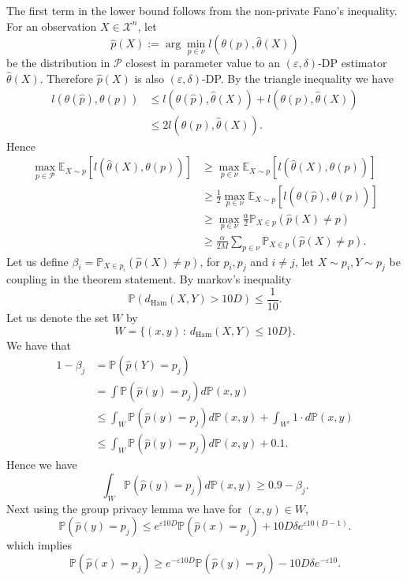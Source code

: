 \documentclass[letterpaper,12pt]{article}
\numberwithin{equation}{section}
\theoremstyle{plain}
\numberwithin{Theorem}{section}
\numberwithin{corollary}{section}
\numberwithin{proposition}{section}
\numberwithin{Lemma}{section}
{
	\theoremstyle{definition}
	\newtheorem{Definition}{Definition}
	\newtheorem{example}{Example}
	\numberwithin{example}{section}
	\newtheorem{fact}{Fact}
	\numberwithin{fact}{section}
	\newtheorem{remark}{Remark}
}
\newcommand{\Pro}{\mathbb{P}}
\newcommand{\1}{\mathbbm{1}}
\def\E{\mathbb{E}}
\begin{document}
The first term in the lower bound follows from the non-private Fano's inequality. For an observation $X \in \mathcal{X}^n$, let
$$
\widehat p(X) := \arg \min_{ p \in \nu}  l(\theta(p), \widehat{\theta}(X))
$$ 
be the distribution in $\mathcal{P}$ closest in parameter value to an $(\varepsilon,\delta)$-DP estimator $\hat \theta(X)$. Therefore $\hat p(X)$ is also $(\varepsilon,\delta)$-DP. By the triangle inequality we have 
\begin{align*}
	l(\theta(\hat p), \theta(p)) &\leq l(\theta(\hat p),\hat \theta(X)) + l(\theta(p),\hat{\theta}(X))\\
	&\leq 2 l(\theta(p),\hat \theta(X)).
\end{align*}
Hence
\begin{align}
	\max_{p \in \mathcal{P}} \E_{X \sim p}[l(\hat \theta(X),\theta(p))] &\geq \max_{p \in \nu} \E_{X \sim p}[l(\hat \theta(X),\theta(p))]\nonumber\\
	&\geq \frac{1}{2} \max_{ p \in \nu}\E_{X \sim p}[l(\hat \theta(\hat p),\theta(p))]\nonumber\\
	&\geq \max_{p \in \nu} \frac{\alpha}{2} \Pro_{X \in p}(\hat p(X) \neq p)\nonumber\\
	&\geq \frac{\alpha}{2M} \sum_{p \in \nu} \Pro_{X \in p}(\hat p(X) \neq p). \label{eq: minimax-to-multiple-testing}
\end{align}
Let us define $\beta_i = \Pro_{X \in p_i}(\hat p(X) \neq p)$, for $p_i,p_j$ and $i \neq j$, let $X\sim p_i,Y\sim p_j$ be coupling in the theorem statement. By markov's inequality 
$$
\Pro(d_{\text{Ham}}(X,Y) > 10D) \leq \frac{1}{10}.
$$
Let us denote the set $W$ by
$$
W = \{(x,y)\,:\, d_{\text{Ham}}(X,Y) \leq 10D \}.
$$
We have that
\begin{align*}
	1-\beta_j &= \Pro(\hat p(Y) = p_j)  \\
	&= \int \Pro(\hat p(y) = p_j) d\Pro(x,y)\\\
	&\leq \int_W \Pro(\hat p(y) = p_j) d\Pro(x,y) + \int_{W^c} 1 \cdot d\Pro(x,y) \\
	&\leq \int_W \Pro(\hat p(y) = p_j) d\Pro(x,y) + 0.1.
\end{align*}
Hence we have 
\begin{equation}\label{eq: prob-under-y}
	\int_W \Pro(\hat p(y) = p_j) d\Pro(x,y)  \geq 0.9 - \beta_j.
\end{equation}
Next using the group privacy lemma we have for $(x,y) \in W$,
$$
\Pro(\hat p(y) = p_j) \leq e^{\varepsilon10D}\Pro( \hat p(x) = p_j ) + 10D\delta e^{\varepsilon10(D-1)}.
$$
which implies
\begin{equation}\label{eq: group-privacy-lower-bound}
	\Pro(\hat p(x) = p_j) \geq e^{-\varepsilon10D}\Pro( \hat p(y) = p_j ) - 10D\delta e^{-\varepsilon10}.
\end{equation}
\end{document}
